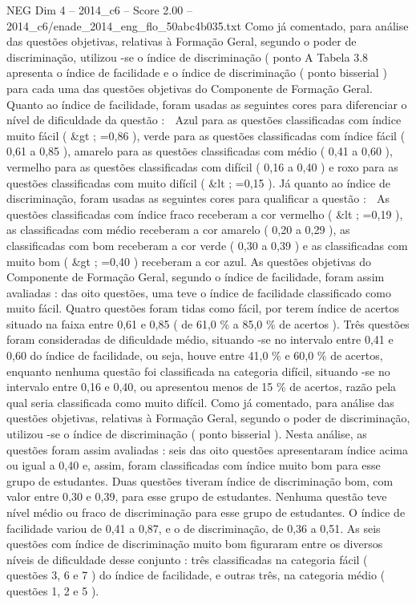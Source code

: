 \begin{textsample}{NEG Dim 4 – 2014\_c6 – Score 2.00 – 2014\_c6/enade\_2014\_eng\_flo\_50abc4b035.txt}
Como já comentado, para análise das questões objetivas, relativas à Formação Geral, segundo o poder de discriminação, utilizou -se o índice de discriminação ( ponto A Tabela 3.8 apresenta o índice de facilidade e o índice de discriminação ( ponto bisserial ) para cada uma das questões objetivas do Componente de Formação Geral.
Quanto ao índice de facilidade, foram usadas as seguintes cores para diferenciar o nível de dificuldade da questão :  Azul para as questões classificadas com índice muito fácil ( \&gt ; =0,86 ), verde para as questões classificadas com índice fácil ( 0,61 a 0,85 ), amarelo para as questões classificadas com médio ( 0,41 a 0,60 ), vermelho para as questões classificadas com difícil ( 0,16 a 0,40 ) e roxo para as questões classificadas com muito difícil ( \&lt ; =0,15 ).
Já quanto ao índice de discriminação, foram usadas as seguintes cores para qualificar a questão :  As questões classificadas com índice fraco receberam a cor vermelho ( \&lt ; =0,19 ), as classificadas com médio receberam a cor amarelo ( 0,20 a 0,29 ), as classificadas com bom receberam a cor verde ( 0,30 a 0,39 ) e as classificadas com muito bom ( \&gt ; =0,40 ) receberam a cor azul.
As questões objetivas do Componente de Formação Geral, segundo o índice de facilidade, foram assim avaliadas : das oito questões, uma teve o índice de facilidade classificado como muito fácil.
Quatro questões foram tidas como fácil, por terem índice de acertos situado na faixa entre 0,61 e 0,85 ( de 61,0 \% a 85,0 \% de acertos ).
Três questões foram consideradas de dificuldade médio, situando -se no intervalo entre 0,41 e 0,60 do índice de facilidade, ou seja, houve entre 41,0 \% e 60,0 \% de acertos, enquanto nenhuma questão foi classificada na categoria difícil, situando -se no intervalo entre 0,16 e 0,40, ou apresentou menos de 15 \% de acertos, razão pela qual seria classificada como muito difícil.
Como já comentado, para análise das questões objetivas, relativas à Formação Geral, segundo o poder de discriminação, utilizou -se o índice de discriminação ( ponto bisserial ).
Nesta análise, as questões foram assim avaliadas : seis das oito questões apresentaram índice acima ou igual a 0,40 e, assim, foram classificadas com índice muito bom para esse grupo de estudantes.
Duas questões tiveram índice de discriminação bom, com valor entre 0,30 e 0,39, para esse grupo de estudantes.
Nenhuma questão teve nível médio ou fraco de discriminação para esse grupo de estudantes.
O índice de facilidade variou de 0,41 a 0,87, e o de discriminação, de 0,36 a 0,51.
As seis questões com índice de discriminação muito bom figuraram entre os diversos níveis de dificuldade desse conjunto : três classificadas na categoria fácil ( questões 3, 6 e 7 ) do índice de facilidade, e outras três, na categoria médio ( questões 1, 2 e 5 ).

\end{textsample}
